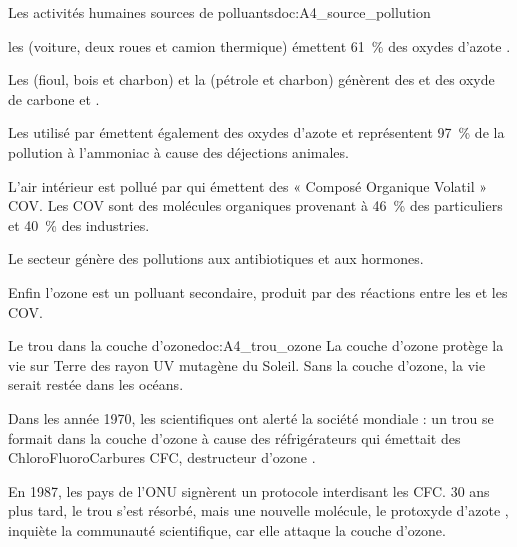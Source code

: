 \begin{doc}{Les activités humaines sources de polluants}{doc:A4_source_pollution}
  \begin{listePoints}
    \item les  (voiture, deux roues et camion thermique) émettent \qty{61}{\percent} des oxydes d'azote .
    \item Les  (fioul, bois et charbon) et la  (pétrole et charbon) génèrent des  et des oxyde de carbone  et .
    \item Les  utilisé par  émettent également des oxydes d'azote  et représentent \qty{97}{\percent} de la pollution à l'ammoniac  à cause des déjections animales.
    \item L'air intérieur est pollué par  qui émettent des « Composé Organique Volatil » COV.
    Les COV sont des molécules organiques provenant à \qty{46}{\percent} des particuliers et \qty{40}{\percent} des industries.
    \item Le secteur  génère des pollutions aux antibiotiques et aux hormones.
    \item Enfin l'ozone est un polluant secondaire, produit par des réactions entre les  et les COV.
  \end{listePoints}
\end{doc}



\begin{doc}{Le trou dans la couche d'ozone}{doc:A4_trou_ozone}
  La couche d'ozone protège la vie sur Terre des rayon UV mutagène du Soleil.
  Sans la couche d'ozone, la vie serait restée dans les océans.

  Dans les année 1970, les scientifiques ont alerté la société mondiale : un trou se formait dans la couche d'ozone à cause des réfrigérateurs qui émettait des ChloroFluoroCarbures CFC, destructeur d'ozone .

  En 1987, les pays de l'ONU signèrent un protocole interdisant les CFC.
  30 ans plus tard, le trou s'est résorbé, mais une nouvelle molécule, le protoxyde d'azote , inquiète la communauté scientifique, car elle attaque la couche d'ozone.
\end{doc}

